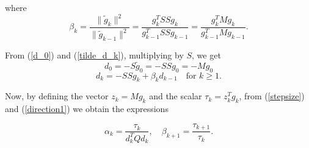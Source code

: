 \documentclass{ExerciseSheet}
\begin{document}
\begin{solution}
where
\begin{equation} \label{direction1}
    \beta_k = \frac{\|\tilde{g}_k\|^2}{\|\tilde{g}_{k-1}\|^2} = \frac{g_k^T SS g_k}{g_{k-1}^T SS g_{k-1}} = \frac{g_k^T M g_k}{g_{k-1}^T M g_{k-1}}.
\end{equation}

From (\ref{d_0}) and (\ref{tilde_d_k}), multiplying by $ S$, we get
\begin{equation}
    d_0 = -S \tilde{g}_0 = -S S g_0 = -M g_0 
\end{equation}
\begin{equation}
    d_k = -SSg_k + \beta_k d_{k-1} \quad \text{for } k \geq 1. 
\end{equation}

Now, by defining the vector $ z_k = M g_k $ and the scalar $ \tau_k = z_k^T g_k $, from (\ref{stepsize}) and (\ref{direction1}) we obtain the expressions

\begin{equation}
    \alpha_k = \frac{\tau_k}{d_k^T Q d_k}, \quad 
    \beta_{k+1} = \frac{\tau_{k+1}}{\tau_k}.
\end{equation}
\end{solution}
\end{document}
